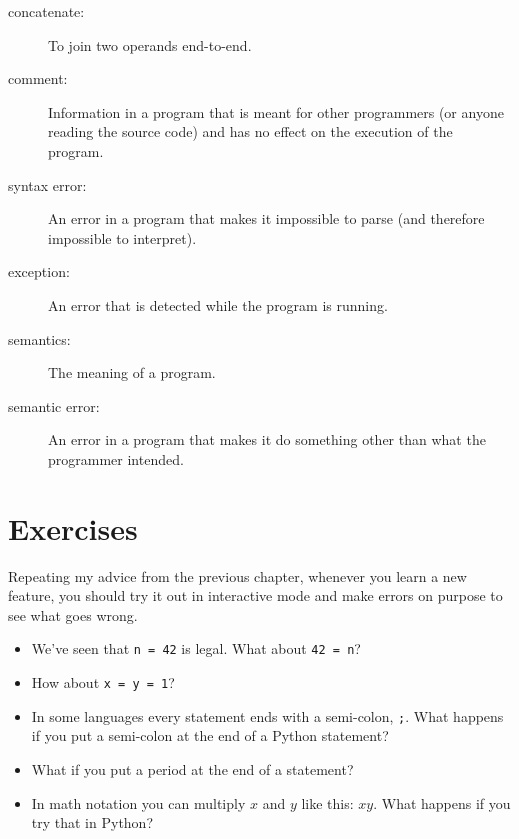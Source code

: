 \documentclass[10pt]{book}
\begin{document}
\begin{description}
\item[concatenate:]  To join two operands end-to-end.

\item[comment:]  Information in a program that is meant for other
programmers (or anyone reading the source code) and has no effect on the
execution of the program.

\item[syntax error:]  An error in a program that makes it impossible
to parse (and therefore impossible to interpret).

\item[exception:]  An error that is detected while the program is running.

\item[semantics:]  The meaning of a program.

\item[semantic error:]   An error in a program that makes it do something
other than what the programmer intended.

\end{description}


\section{Exercises}

\begin{exercise}

Repeating my advice from the previous chapter, whenever you learn
a new feature, you should try it out in interactive mode and make
errors on purpose to see what goes wrong.

\begin{itemize}

\item We've seen that {\tt n = 42} is legal.  What about {\tt 42 = n}?

\item How about {\tt x = y = 1}?

\item In some languages every statement ends with a semi-colon, {\tt ;}.
What happens if you put a semi-colon at the end of a Python statement?

\item What if you put a period at the end of a statement?

\item In math notation you can multiply $x$ and $y$ like this: $x y$.
What happens if you try that in Python?

\end{itemize}

\end{exercise}
\end{document}
